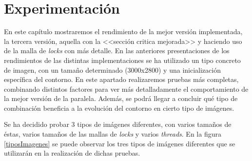 \chapter{Experimentaci\'{o}n}

En este cap\'{i}tulo mostraremos el rendimiento de la mejor versi\'{o}n implementada, la tercera versi\'{o}n, aquella con la <<secci\'{o}n critica mejorada>> y haciendo uso de la malla de \textit{locks} con m\'{a}s detalle. En las anteriores presentaciones de los rendimientos de las distintas implementaciones se ha utilizado un tipo concreto de imagen, con un tama\~{n}o determinado (3000x2800) y una inicializaci\'{o}n espec\'{i}fica del contorno. En este apartado realizaremos pruebas m\'{a}s completas, combinando distintos factores para ver m\'{a}s detalladamente el comportamiento de la mejor versi\'{o}n de la paralela. Adem\'{a}s, se podr\'{a} llegar a concluir qu\'{e} tipo de combinaci\'{o}n beneficia a la evoluci\'{o}n del contorno en cierto tipo de im\'{a}genes.

Se ha decidido probar 3 tipos de im\'{a}genes diferentes, con varios tama\~{n}os de \'{e}stas, varios tama\~{n}os de las mallas de \textit{locks} y varios \textit{threads}. En la figura \ref{tiposImagenes} se puede observar los tres tipos de im\'{a}genes diferentes que se utilizar\'{a}n en la realizaci\'{o}n de dichas pruebas.

\

\

